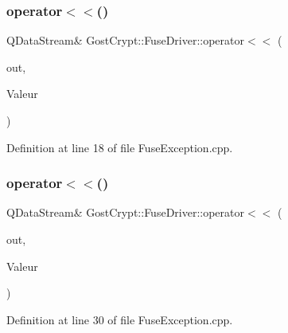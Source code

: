 \subsubsection{\texorpdfstring{operator$<$$<$()}{operator<<()}\hspace{0.1cm}{\footnotesize\ttfamily [1/6]}}
{\footnotesize\ttfamily Q\+Data\+Stream\& Gost\+Crypt\+::\+Fuse\+Driver\+::operator$<$$<$ (\begin{DoxyParamCaption}\item[{Q\+Data\+Stream \&}]{out,  }\item[{const \hyperlink{class_gost_crypt_1_1_fuse_driver_1_1_fuse_exception}{Gost\+Crypt\+::\+Fuse\+Driver\+::\+Fuse\+Exception} \&}]{Valeur }\end{DoxyParamCaption})}



Definition at line 18 of file Fuse\+Exception.\+cpp.

\mbox{\label{namespace_gost_crypt_1_1_fuse_driver_aef4cd03d9d871a8a50583895d95482e4}} 
\subsubsection{\texorpdfstring{operator$<$$<$()}{operator<<()}\hspace{0.1cm}{\footnotesize\ttfamily [2/6]}}
{\footnotesize\ttfamily Q\+Data\+Stream\& Gost\+Crypt\+::\+Fuse\+Driver\+::operator$<$$<$ (\begin{DoxyParamCaption}\item[{Q\+Data\+Stream \&}]{out,  }\item[{const \hyperlink{class_gost_crypt_1_1_fuse_driver_1_1_fuse_timeout}{Gost\+Crypt\+::\+Fuse\+Driver\+::\+Fuse\+Timeout} \&}]{Valeur }\end{DoxyParamCaption})}



Definition at line 30 of file Fuse\+Exception.\+cpp.

\mbox{\label{namespace_gost_crypt_1_1_fuse_driver_a96ed1895ad77a48bd148ea73bab31fae}} 
